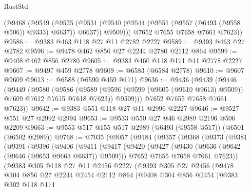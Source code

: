\begin{lexlean}{RustStd}
\begin{coremodule}
        (@9468
          (@9519
            (@9525
              (@9531 (@9540 (@9544 (@9551 (@9557 (@6493 (@9558 @506)) @9333) @6637)) @6637))
              @9509)))
        @7652
        @7655
        @7658
        @7661
        @7623))
@9586 := @9383 @463 @118 @27 @11 @2782 @2227
@9589 := @9393 @463 @27 @2782
@9596 := @9478 @462 @856 @27 @2244 @2780 @2112 @864
@9599 := @9408 @462 @856 @2780
@9605 := @9383 @460 @118 @171 @11 @2778 @2227
@9607 := @9497 @459 @2778
@9609 := @6583 (@6584 @2778)
@9610 := @9607 @9609
@9613 := @6588 (@6590 @459 @171)
@9636 := @9436
    (@9439
      (@9446
        (@9449
          (@9580
            (@9586
              (@9589 (@9596 (@9599 (@9605 (@9610 @9613) @9509)) @7609 @7612 @7615 @7618 @7623))
              @9509)))
        @7652
        @7655
        @7658
        @7661
        @7623))
@9642 := @9383 @551 @118 @27 @11 @2996 @2227
@9646 := @9527 @551 @27 @2992 @2994
@9653 := @9533 @550 @27 @46 @2989 @2196 @506 @2209
@9663 := @9553 @517 @155 @517 @2989 (@6493 (@9558 @517)) (@6501 (@6502 @2989))
@9768 := @7035
    (@9057
      (@9184
        (@9357
          (@9368
            (@9373
              (@9381
                (@9391
                  (@9396
                    (@9406
                      (@9411
                        (@9417
                          (@9420
                            (@9427
                              (@9430 (@9636 (@9642 (@9646 (@9653 @9663 @6637)) @9509)))
                              @7652
                              @7655
                              @7658
                              @7661
                              @7623))
                          (@9383
                            @305
                            @118
                            @27
                            @11
                            @2456
                            @2227
                            (@9393
                              @305
                              @27
                              @2456
                              (@9478
                                @304
                                @856
                                @27
                                @2244
                                @2454
                                @2112
                                @864
                                (@9408
                                  @304
                                  @856
                                  @2454
                                  (@9383
                                    @302
                                    @118
                                    @171

\end{coremodule}
\end{lexlean}
